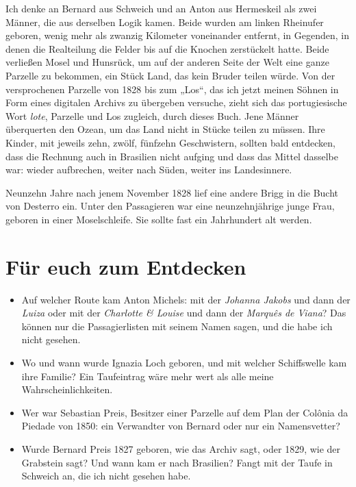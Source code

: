 \documentclass[
  ngerman,
  11pt,
  openany]{book}
\providecommand{\tightlist}{%
  \setlength{\itemsep}{0pt}\setlength{\parskip}{0pt}}
\begin{document}
Ich denke an Bernard aus Schweich und an Anton aus Hermeskeil als zwei
Männer, die aus derselben Logik kamen. Beide wurden am linken Rheinufer
geboren, wenig mehr als zwanzig Kilometer voneinander entfernt, in
Gegenden, in denen die Realteilung die Felder bis auf die Knochen
zerstückelt hatte. Beide verließen Mosel und Hunsrück, um auf der
anderen Seite der Welt eine ganze Parzelle zu bekommen, ein Stück Land,
das kein Bruder teilen würde. Von der versprochenen Parzelle von 1828
bis zum „Los``, das ich jetzt meinen Söhnen in Form eines digitalen
Archivs zu übergeben versuche, zieht sich das portugiesische Wort
\emph{lote}, Parzelle und Los zugleich, durch dieses Buch. Jene Männer
überquerten den Ozean, um das Land nicht in Stücke teilen zu müssen.
Ihre Kinder, mit jeweils zehn, zwölf, fünfzehn Geschwistern, sollten
bald entdecken, dass die Rechnung auch in Brasilien nicht aufging und
dass das Mittel dasselbe war: wieder aufbrechen, weiter nach Süden,
weiter ins Landesinnere.

Neunzehn Jahre nach jenem November 1828 lief eine andere Brigg in die
Bucht von Desterro ein. Unter den Passagieren war eine neunzehnjährige
junge Frau, geboren in einer Moselschleife. Sie sollte fast ein
Jahrhundert alt werden.

\section{Für euch zum Entdecken}\label{fuxfcr-euch-zum-entdecken-7}

\begin{itemize}
\tightlist
\item
  Auf welcher Route kam Anton Michels: mit der \emph{Johanna Jakobs} und
  dann der \emph{Luiza} oder mit der \emph{Charlotte \& Louise} und dann
  der \emph{Marquês de Viana}? Das können nur die Passagierlisten mit
  seinem Namen sagen, und die habe ich nicht gesehen.
\item
  Wo und wann wurde Ignazia Loch geboren, und mit welcher Schiffswelle
  kam ihre Familie? Ein Taufeintrag wäre mehr wert als alle meine
  Wahrscheinlichkeiten.
\item
  Wer war Sebastian Preis, Besitzer einer Parzelle auf dem Plan der
  Colônia da Piedade von 1850: ein Verwandter von Bernard oder nur ein
  Namensvetter?
\item
  Wurde Bernard Preis 1827 geboren, wie das Archiv sagt, oder 1829, wie
  der Grabstein sagt? Und wann kam er nach Brasilien? Fangt mit der
  Taufe in Schweich an, die ich nicht gesehen habe.
\end{itemize}
\end{document}
